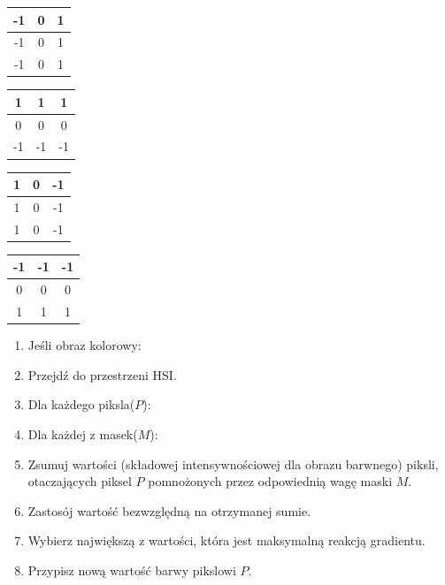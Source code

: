 \documentclass[final,a4paper,openany,12pt]{mwbk}
\begin{document}
\begin{center}
	\begin{tabular}{|c|c|c|}
		\hline
		-1 & 0 & 1\\
		\hline
		-1 & 0 & 1\\
		\hline
		-1 & 0 & 1\\
		\hline
	\end{tabular}
\end{center}

\begin{center}
	\begin{tabular}{|c|c|c|}
		\hline
		1 & 1 & 1\\
		\hline
		0 & 0 & 0\\
		\hline
		-1 & -1 & -1\\
		\hline
	\end{tabular}
\end{center}

\begin{center}
	\begin{tabular}{|c|c|c|}
		\hline
		1 & 0 & -1\\
		\hline
		1 & 0 & -1\\
		\hline
		1 & 0 & -1\\
		\hline
	\end{tabular}
\end{center}

\begin{center}
	\begin{tabular}{|c|c|c|}
		\hline
		-1 & -1 & -1\\
		\hline
		0 & 0 & 0\\
		\hline
		1 & 1 & 1\\
		\hline
	\end{tabular}
\end{center}

\begin{enumerate}
	\item Jeśli obraz kolorowy:
	\item Przejdź do przestrzeni HSI.
	\item Dla każdego piksla($P$):
	\item Dla każdej z masek($M$):
	\item Zsumuj wartości (składowej intensywnościowej dla obrazu barwnego) piksli, otaczających piksel $P$ pomnożonych przez odpowiednią wagę maski $M$.
	\item Zastosój wartość bezwzględną na otrzymanej sumie.
	\item Wybierz największą z wartości, która jest maksymalną reakcją gradientu.
	\item Przypisz nową wartość barwy pikslowi $P$.
\end{enumerate}
\end{document}
